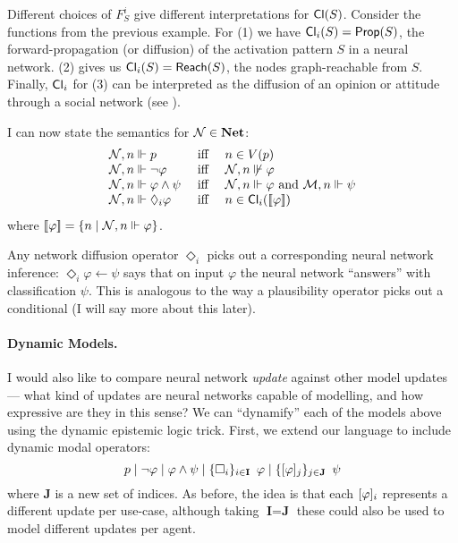 \documentclass[letterpaper]{article}
\begin{document}
\begin{example*}
    Different choices of $F^i_S$ give different interpretations for $\mathsf{Cl}(S)$.  Consider the functions from the previous example.  For (1) we have $\mathsf{Cl}_i(S) = \mathsf{Prop}(S)$, the forward-propagation (or diffusion) of the activation pattern $S$ in a neural network.  (2) gives us $\mathsf{Cl}_i(S) = \mathsf{Reach}(S)$, the nodes graph-reachable from $S$.  Finally, $\mathsf{Cl}_i$ for (3) can be interpreted as the diffusion of an opinion or attitude through a social network (see \cite{baltag2019socialnetworks}).
\end{example*}

I can now state the semantics for $\mathcal{N} \in \textrm{\textbf{Net}}$:
\[
\begin{array}{lcl}
    \mathcal{N}, n \Vdash p & \mbox{ iff } & n \in V(p)\\
    \mathcal{N}, n \Vdash \neg \varphi & \mbox{ iff } & \mathcal{N}, n \not \Vdash \varphi\\
    \mathcal{N}, n \Vdash \varphi \land \psi & \mbox{ iff } & \mathcal{N}, n \Vdash \varphi \mbox{ and } \mathcal{M}, n \Vdash \psi\\
    \mathcal{N}, n \Vdash \Diamond_i \varphi & \mbox{ iff } & 
    n \in \mathsf{Cl}_i([\![\mbox{\em $ \varphi $\/}]\!])
\end{array}
\]
where $[\![\mbox{\em $ \varphi $\/}]\!] = \{ n \mid \mathcal{N}, n \Vdash \varphi \}$.  

Any network diffusion operator $\Diamond_i$ picks out a corresponding neural network inference: $\Diamond_i \varphi \leftarrow \psi$ says that on input $\varphi$ the neural network ``answers'' with classification $\psi$.  This is analogous to the way a plausibility operator picks out a conditional (I will say more about this later).

\paragraph*{Dynamic Models.}

I would also like to compare neural network \emph{update} against other model updates --- what kind of updates are neural networks capable of modelling, and how expressive are they in this sense?  We can ``dynamify'' each of the models above using the dynamic epistemic logic trick.  First, we extend our language to include dynamic modal operators:
\[
    p \mid \neg \varphi \mid \varphi \land \psi \mid \{ \Box_i \}_{i \in \textbf{I}} \hspace*{0.5em} \varphi \mid \{ [\varphi]_j \}_{j \in \textbf{J}} \hspace*{0.5em} \psi
\]
where \textbf{J} is a new set of indices.  As before, the idea is that each $[\varphi]_i$ represents a different update per use-case, although taking $\textbf{I} = \textbf{J}$ these could also be used to model different updates per agent.  
\end{document}
